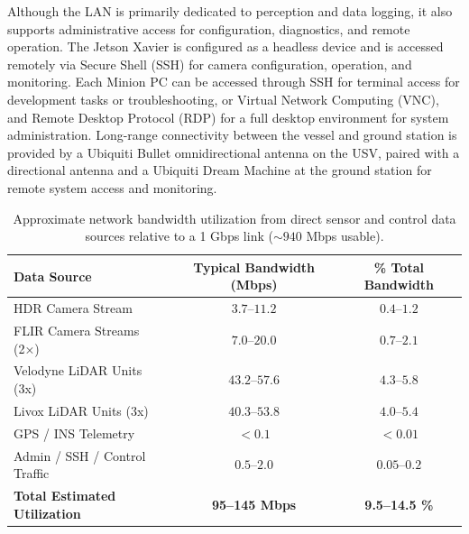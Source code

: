 \documentclass[../main.tex]{subfiles}
\begin{document}
Although the LAN is primarily dedicated to perception and data logging, it also supports administrative access for configuration, diagnostics, and remote operation.
The Jetson Xavier is configured as a headless device and is accessed remotely via Secure Shell (SSH) for camera configuration, operation, and monitoring.
Each Minion PC can be accessed through SSH for terminal access for development tasks or troubleshooting, or Virtual Network Computing (VNC), and Remote Desktop Protocol (RDP) for a full desktop environment for system administration.
Long-range connectivity between the vessel and ground station is provided by a Ubiquiti Bullet omnidirectional antenna on the \ac{USV}, paired with a directional antenna and a Ubiquiti Dream Machine at the ground station for remote system access and monitoring.

\begin{table}[htbp]
\centering
\begin{tabular}{lcc}
\hline
Data Source & Typical Bandwidth (Mbps) & \% Total Bandwidth \\
\hline
\hline
HDR Camera Stream & $3.7$--$11.2$ & $0.4$--$1.2$ \\
FLIR Camera Streams (2×) & $7.0$--$20.0$ & $0.7$--$2.1$ \\
Velodyne LiDAR Units (3x) & $43.2$--$57.6$ & $4.3$--$5.8$ \\
Livox LiDAR Units (3x) & $40.3$--$53.8$ & $4.0$--$5.4$ \\
GPS / INS Telemetry & $<0.1$ & $<0.01$ \\
Admin / SSH / Control Traffic & $0.5$--$2.0$ & $0.05$--$0.2$ \\
\hline
\textbf{Total Estimated Utilization} & \textbf{95--145 Mbps} & \textbf{9.5--14.5 \%} \\
\end{tabular}
\caption{Approximate network bandwidth utilization from direct sensor and control data sources relative to a 1 Gbps link ($\sim940$ Mbps usable).}
\label{table:network_bandwidth}
\end{table}
\end{document}
